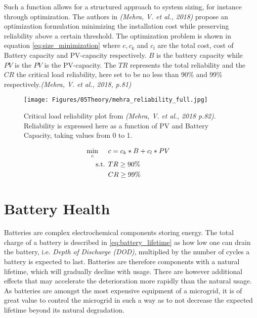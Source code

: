 Such a function allows for a structured approach to system sizing, for instance through optimization. The authors in \textit{(Mehra, V. et al., 2018)} propose an optimization formulation minimizing the installation cost while preserving reliability above a certain threshold. The optimization problem is shown in equation \ref{eq:size_minimization} where $c, c_{k}$ and $c_{l}$ are the total cost, cost of Battery capacity and PV-capacity respectively. $B$ is the battery capacity while $PV$ is the $PV$ is the PV-capacity. The $TR$ represents the total reliability and the $CR$ the critical load reliability, here set to be no less than 90\% and 99\% respectively.\textit{(Mehra, V. et al., 2018, p.81)}\cite{Mehra2018-xs}

\begin{figure}[h]
    \centering
    \texttt{[image: Figures/05Theory/mehra\_reliability\_full.jpg]}
    \caption[Critical Load Reliability Plot]{Critical load reliability plot from \textit{(Mehra, V. et al., 2018 p.82)}\cite{Mehra2018-xs}. Reliability is expressed here as a function of PV and Battery Capacity, taking values from 0 to 1.}
    \label{fig:mehra_reliability_full}
\end{figure}

\begin{align}
    \min_c\hspace{0.5cm} & c = c_k * B + c_l * PV\notag\\
    \text{s.t.  } & TR \geq 90\%\notag\\
    & CR \geq 99\%
    \label{eq:size_minimization}
\end{align}


\section{Battery Health}\label{seq:battery_health}

Batteries are complex electrochemical components storing energy. The total charge of a battery is described in \ref{eq:battery_lifetime} as how low one can drain the battery, i.e. \textit{Depth of Discharge (DOD)}, multiplied by the number of cycles a battery is expected to last. Batteries are therefore components with a natural lifetime, which will gradually decline with usage. There are however additional effects that may accelerate the deterioration more rapidly than the natural usage. As batteries are amongst the most expensive equipment of a microgrid, it is of great value to control the microgrid in such a way as to not decrease the expected lifetime beyond its natural degradation. \\

